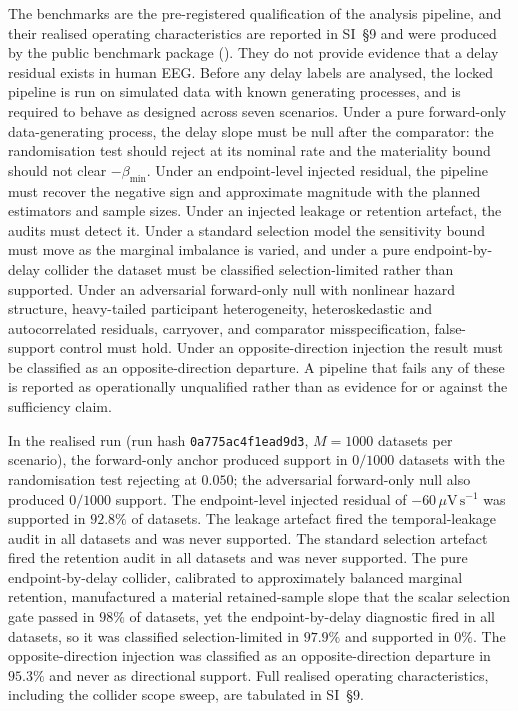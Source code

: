 \documentclass[11pt,a4paper]{article}
\theoremstyle{definition}
\begin{document}
The benchmarks are the pre-registered qualification of the analysis pipeline,
and their realised operating characteristics are reported in SI~\S9 and were
produced by the public benchmark package ().
They do not provide evidence that a
delay residual exists in human EEG. Before any delay labels are analysed, the
locked pipeline is run on simulated data with known generating processes, and is
required to behave as designed across seven scenarios. Under a pure forward-only
data-generating process, the delay slope must be null after the comparator: the
randomisation test should reject at its nominal rate and the materiality bound
should not clear \(-\beta_{\min}\). Under an endpoint-level injected residual, the
pipeline must recover the negative sign and approximate magnitude with the planned
estimators and sample sizes. Under an injected leakage or retention artefact, the
audits must detect it. Under a standard selection model the sensitivity bound must
move as the marginal imbalance is varied, and under a pure endpoint-by-delay
collider the dataset must be classified selection-limited rather than supported.
Under an adversarial forward-only null with nonlinear hazard structure,
heavy-tailed participant heterogeneity, heteroskedastic and autocorrelated
residuals, carryover, and comparator misspecification, false-support control must
hold. Under an opposite-direction injection the result must be classified as an
opposite-direction departure. A pipeline that fails any of these is reported as
operationally unqualified rather than as evidence for or against the sufficiency
claim.

In the realised run (run hash \texttt{0a775ac4f1ead9d3}, \(M=1000\) datasets per
scenario), the forward-only anchor produced support in \(0/1000\) datasets with the
randomisation test rejecting at \(0.050\); the adversarial forward-only null also
produced \(0/1000\) support. The endpoint-level injected residual of
\(-60\,\mu\mathrm{V\,s^{-1}}\) was supported in \(92.8\%\) of datasets. The leakage
artefact fired the temporal-leakage audit in all datasets and was never supported.
The standard selection artefact fired the retention audit in all datasets and was
never supported. The pure endpoint-by-delay collider, calibrated to approximately
balanced marginal retention, manufactured a material retained-sample slope that the
scalar selection gate passed in \(98\%\) of datasets, yet the endpoint-by-delay diagnostic
fired in all datasets, so it was classified selection-limited in \(97.9\%\) and
supported in \(0\%\). The opposite-direction injection was classified as an
opposite-direction departure in \(95.3\%\) and never as directional support. Full
realised operating characteristics, including the collider scope sweep, are
tabulated in SI~\S9.
\end{document}
